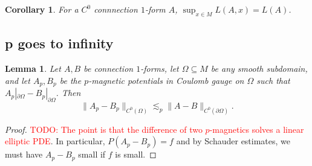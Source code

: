 \documentclass[reqno,11pt]{amsart}
\newtheorem{lemma}[theorem]{Lemma}
\newtheorem{corollary}[theorem]{Corollary}
\theoremstyle{definition}
\numberwithin{equation}{section}
\newcommand\todo[1]{\textcolor{red}{TODO: #1}}
\begin{document}
\begin{corollary}
For a $C^0$ connnection $1$-form $A$, $\sup_{x \in M} L(A, x) = L(A)$.
\end{corollary}

\subsection{p goes to infinity}
\begin{lemma}
Let $A, B$ be connection $1$-forms, let $\Omega \subseteq M$ be any smooth subdomain, and let $A_p, B_p$ be the $p$-magnetic potentials in Coulomb gauge on $\Omega$ such that $A_p|_{\partial \Omega} - B_p|_{\partial \Omega}$.
Then 
\begin{equation}\label{uniqueness for p}
	\|A_p - B_p\|_{C^0(\Omega)} \lesssim_p \|A - B\|_{C^0(\partial \Omega)}.
\end{equation}
\end{lemma}
\begin{proof}
	\todo{The point is that the difference of two $p$-magnetics solves a linear elliptic PDE}.
	In particular, $P(A_p - B_p) = f$ and by Schauder estimates, we must have $A_p - B_p$ small if $f$ is small.
\end{proof}
\end{document}
